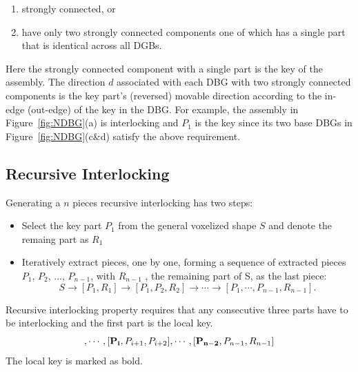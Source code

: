 \begin{enumerate}
	\item strongly connected, or 
	\item have only two strongly connected components one of which has a single part that is identical across all DGBs.
\end{enumerate}	
Here the strongly connected component with a single part is the key of the assembly.
The direction $d$ associated with each DBG with two strongly connected components is the key part's (reversed) movable direction according to the in-edge (out-edge) of the key in the DBG.
For example, the assembly in Figure~\ref{fig:NDBG}(a) is interlocking and $P_1$ is the key since its two base DBGs in Figure~\ref{fig:NDBG}(c\&d) satisfy the above requirement.



\subsection{Recursive Interlocking}
Generating a $n$ pieces recursive interlocking has two steps:
\begin{itemize}[leftmargin=*]
	\item Select the key part $P_1$ from the general voxelized shape $S$ and denote the remaing part as $R_1$
	\vspace{1mm}
	\item Iteratively extract pieces, one by one, forming a sequence of extracted pieces $P_1$, $P_2$, ..., $P_{n - 1}$, with $R_{n - 1}$ , the remaining part of S, as the last piece:\begin{equation*}
		S \rightarrow [P_1,R_1] \rightarrow [P_1,P_2,R_2] \rightarrow \cdots\rightarrow [P_1,\cdots, P_{n-1},R_{n-1}] .
	\end{equation*}
\end{itemize} 
Recursive interlocking property requires that any consecutive three parts have to be interlocking and the first part is the local key.
\begin{equation*}
	[{\bf P_1}, P_2, P_3], \cdots, [{\bf P_{i}}, P_{i+1}, P_{i+2}], \cdots, [{\bf P_{n - 2}}, P_{n-1}, R_{n-1}]
\end{equation*}
The local key is marked as bold.

